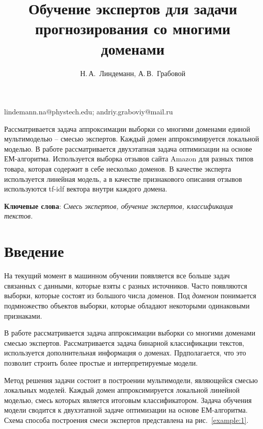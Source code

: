 \documentclass[12pt, twoside]{article}
\begin{document}
\title
    {Обучение экспертов для задачи прогнозирования со многими доменами} %
\author
    {Н.\,А.~Линдеманн, А.\,В.~Грабовой} %
\email
    {lindemann.na@phystech.edu; andriy.graboviy@mail.ru}
\abstract
    {Рассматривается задача аппроксимации выборки со многими доменами единой мультимоделью -- смесью экспертов. Каждый домен аппроксимируется локальной моделью. В работе рассматривается двухэтапная задача оптимизации на основе ЕМ-алгоритма. Используется выборка отзывов сайта Amazon для разных типов товара, которая содержит в себе несколько доменов. В качестве эксперта используется линейная модель, а в качестве признакового описания отзывов используются tf-idf вектора внутри каждого домена.

	
\bigskip
\noindent
\textbf{Ключевые слова}: \emph {Смесь экспертов, обучение экспертов, классификация текстов.}

}


\maketitle
\linenumbers

\section{Введение}
На текущий момент в машинном обучении появляется все больше задач связанных с данными, которые взяты с разных источников. Часто появляются выборки, которые состоят из большого числа доменов. Под \textit{доменом} понимается подмножество объектов выборки, которые обладают некоторыми одинаковыми признаками. 

В работе рассматривается задача аппроксимации выборки со многими доменами смесью экспертов. Рассматривается задача бинарной классификации текстов, используется дополнительная информация о доменах. Прдполагается, что это позволит строить более простые и интерпретируемые модели.

Метод решения задачи состоит в построении мультимодели, являющейся смесью локальных моделей. Каждый домен аппроксимируется локальной линейной моделью, смесь которых является итоговым классификатором. Задача обучения модели сводится к двухэтапной задаче оптимизации на основе ЕМ-алгоритма. Схема способа построения смеси экспертов представлена на рис.~\ref{example:1}.
\end{document}
